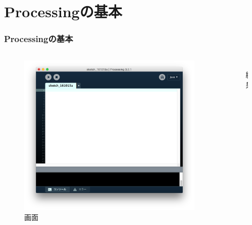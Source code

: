 \documentclass[10pt, dvipdfmx]{beamer}
\begin{document}
    \section{Processingの基本}
        \begin{frame}
            \frametitle{Processingの基本}
            \tiny
            \begin{columns}[c]
                \begin{column}{0.35\textwidth}
                    \begin{figure}[htb]
                        \includegraphics[width=\columnwidth]{images/01.png}
                        \caption{画面}
                        \label{fig:01}
                    \end{figure}
                \end{column}
                \begin{column}{0.20\textwidth}
                    \begin{figure}[htb]
                        \includegraphics[width=10mm]{images/02.png}
                        \caption{結果}
                        \label{02}
                    \end{figure}
                \end{column}
                \begin{column}{0.45\textwidth}

\end{column}
\end{columns}
\end{frame}
\end{document}

